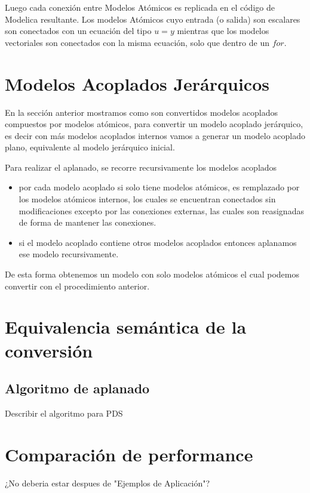 \documentclass[a4paper,	11pt]{report}
\begin{document}
Luego cada conexión entre Modelos Atómicos es replicada en el código de Modelica resultante. Los modelos Atómicos cuyo entrada (o salida) son escalares son conectados con un ecuación del tipo $u = y$ mientras que los modelos vectoriales son conectados con la misma ecuación, solo que dentro de un $for$.

\section{Modelos Acoplados Jerárquicos}

En la sección anterior mostramos como son convertidos modelos acoplados compuestos por modelos atómicos, para convertir un modelo acoplado jerárquico, es decir con más modelos acoplados internos vamos a generar un modelo acoplado plano, equivalente al modelo jerárquico inicial.

Para realizar el aplanado, se recorre recursivamente los modelos acoplados

\begin{itemize}
\item por cada modelo acoplado si solo tiene modelos atómicos, es remplazado por los modelos atómicos internos, los cuales se encuentran conectados sin modificaciones excepto por las conexiones externas, las cuales son reasignadas de forma de mantener las conexiones.
\item si el modelo acoplado contiene otros modelos acoplados entonces aplanamos ese modelo recursivamente.
\end{itemize} 

De esta forma obtenemos un modelo con solo modelos atómicos el cual podemos convertir con el procedimiento anterior.

\section{Equivalencia semántica de la conversión}

\subsection{Algoritmo de aplanado}
Describir el algoritmo para PDS

\section{Comparación de performance}
¿No deberia estar despues de "Ejemplos de Aplicación"?
\end{document}
